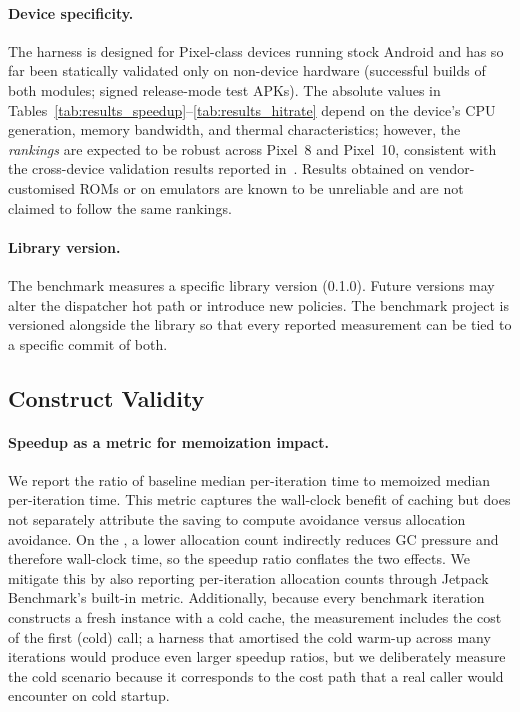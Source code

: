 \paragraph{Device specificity.}
The harness is designed for Pixel-class devices running stock Android and has so far been statically validated only on non-device hardware (successful builds of both modules; signed release-mode test APKs). The absolute values in Tables~\ref{tab:results_speedup}--\ref{tab:results_hitrate} depend on the device's CPU generation, memory bandwidth, and thermal characteristics; however, the \emph{rankings} are expected to be robust across Pixel~8 and Pixel~10, consistent with the cross-device validation results reported in~\cite{empirical_rua}. Results obtained on vendor-customised ROMs or on emulators are known to be unreliable and are not claimed to follow the same rankings.

\paragraph{Library version.}
The benchmark measures a specific library version (0.1.0). Future versions may alter the dispatcher hot path or introduce new policies. The benchmark project is versioned alongside the library so that every reported measurement can be tied to a specific commit of both.

\subsection{Construct Validity}

\paragraph{Speedup as a metric for memoization impact.}
We report the ratio of baseline median per-iteration time to memoized median per-iteration time. This metric captures the wall-clock benefit of caching but does not separately attribute the saving to compute avoidance versus allocation avoidance. On the \jvm, a lower allocation count indirectly reduces GC pressure and therefore wall-clock time, so the speedup ratio conflates the two effects. We mitigate this by also reporting per-iteration allocation counts through Jetpack Benchmark's built-in metric. Additionally, because every benchmark iteration constructs a fresh instance with a cold cache, the measurement includes the cost of the first (cold) call; a harness that amortised the cold warm-up across many iterations would produce even larger speedup ratios, but we deliberately measure the cold scenario because it corresponds to the cost path that a real caller would encounter on cold startup.

